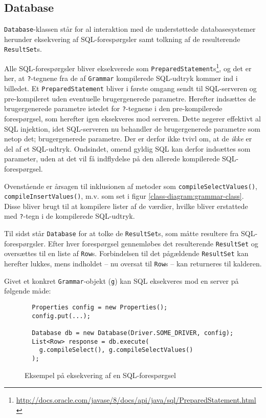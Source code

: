 \subsection{Database}

\texttt{Database}-klassen står for al interaktion med de understøttede databasesystemer herunder eksekvering af SQL-forespørgsler samt tolkning af de resulterende \texttt{ResultSet}s.

Alle SQL-forespørgsler bliver eksekverede som \texttt{Prepared\-Statement}s\footnote{\url{http://docs.oracle.com/javase/8/docs/api/java/sql/PreparedStatement.html}}, og det er her, at \texttt{?}-tegnene fra de af \texttt{Grammar} kompilerede SQL-udtryk kommer ind i billedet. Et \texttt{Prepared\-Statement} bliver i første omgang sendt til SQL-serveren og pre-kompileret uden eventuelle brugergenerede parametre. Herefter indsættes de brugergenerede parametre istedet for \texttt{?}-tegnene i den pre-kompilerede forespørgsel, som herefter igen eksekveres mod serveren. Dette negerer effektivt al SQL injektion, idet SQL-serveren nu behandler de brugergenerede parametre som netop det; brugergenerede parametre. Der er derfor ikke tvivl om, at de \textit{ikke} er del af et SQL-udtryk. Ondsindet, omend gyldig SQL kan derfor indsættes som parameter, uden at det vil få indflydelse på den allerede kompilerede SQL-forespørgsel.

Ovenstående er årsagen til inklusionen af metoder som \texttt{compile\-Select\-Values()}, \texttt{compile\-Insert\-Values()}, m.v. som set i figur \ref{class-diagram:grammar-class}. Disse bliver brugt til at kompilere lister af de værdier, hvilke bliver erstattede med \texttt{?}-tegn i de kompilerede SQL-udtryk.

Til sidst står \texttt{Database} for at tolke de \texttt{Result\-Set}s, som måtte resultere fra SQL-forespørgsler. Efter hver forespørgsel gennemløbes det resulterende \texttt{Result\-Set} og oversættes til en liste af \texttt{Row}s. Forbindelsen til det pågældende \texttt{Result\-Set} kan herefter lukkes, mens indholdet – nu oversat til \texttt{Row}s – kan returneres til kalderen.

Givet et konkret \texttt{Grammar}-objekt (\texttt{g}) kan SQL eksekveres mod en server på følgende måde:

\begin{figure}[h]
  \begin{verbatim}
  Properties config = new Properties();
  config.put(...);
  
  Database db = new Database(Driver.SOME_DRIVER, config);
  List<Row> response = db.execute(
    g.compileSelect(), g.compileSelectValues()
  );
  \end{verbatim}
  \caption{Eksempel på eksekvering af en SQL-forespørgsel}
  \label{code-example:sql-execution}
\end{figure}

